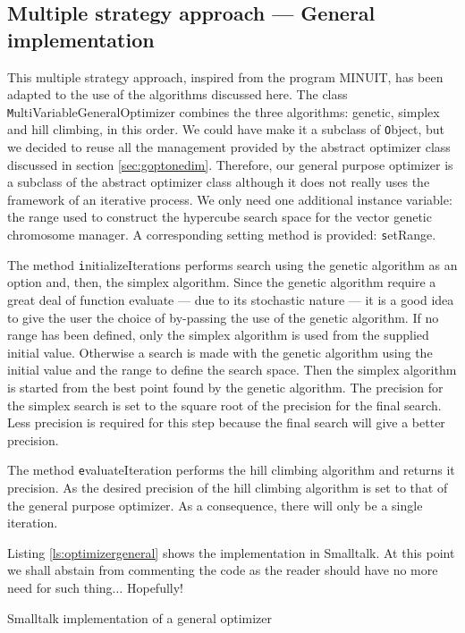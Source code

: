 \subsection{Multiple strategy approach --- General implementation}
This multiple strategy approach, inspired from the program MINUIT,
has been adapted to the use of the algorithms discussed here. The
class {\texttt MultiVariableGeneralOptimizer} combines the three
algorithms: genetic, simplex and hill climbing, in this order. We
could have make it a subclass of {\texttt Object}, but we decided to
reuse all the management provided by the abstract optimizer class
discussed in section \ref{sec:goptonedim}. Therefore, our general
purpose optimizer is a subclass of the abstract optimizer class
although it does not really uses the framework of an iterative
process. We only need one additional instance variable: the range
used to construct the hypercube search space for the vector
genetic chromosome manager. A corresponding setting method is
provided: {\texttt setRange}.

The method {\texttt initializeIterations} performs search using the
genetic algorithm as an option and, then, the simplex algorithm.
Since the genetic algorithm require a great deal of function
evaluate --- due to its stochastic nature --- it is a good idea to
give the user the choice of by-passing the use of the genetic
algorithm. If no range has been defined, only the simplex
algorithm is used from the supplied initial value. Otherwise a
search is made with the genetic algorithm using the initial value
and the range to define the search space. Then the simplex
algorithm is started from the best point found by the genetic
algorithm. The precision for the simplex search is set to the
square root of the precision for the final search. Less precision
is required for this step because the final search will give a
better precision.

The method {\texttt evaluateIteration} performs the hill climbing
algorithm and returns it precision. As the desired precision of
the hill climbing algorithm is set to that of the general purpose
optimizer. As a consequence, there will only be a single
iteration.

Listing \ref{ls:optimizergeneral} shows the implementation in
Smalltalk. At this point we shall abstain from
commenting the code as the reader should have no more need for
such thing$\ldots$ Hopefully!

\begin{listing} Smalltalk
implementation of a general optimizer \label{ls:optimizergeneral}

\end{listing}

